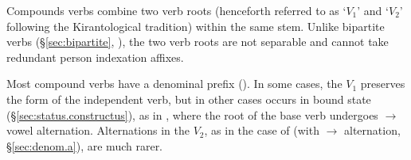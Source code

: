 %
Compounds verbs combine two verb roots (henceforth referred to as `$V_1$' and `$V_2$' following the Kirantological tradition) within the same stem. Unlike bipartite verbs (§\ref{sec:bipartite}, \citealt{jacques18bipartite}), the two verb roots are not separable and cannot take redundant person indexation affixes. 

Most compound verbs have a denominal prefix (). In some cases, the $V_1$ preserves the form of the independent verb, but in other cases occurs in bound state (§\ref{sec:status.constructus}), as in , where the root of the base verb  undergoes  $\rightarrow$  vowel alternation. Alternations in the $V_2$, as in the case of  (with  $\rightarrow$  alternation, §\ref{sec:denom.a}), are much rarer.



